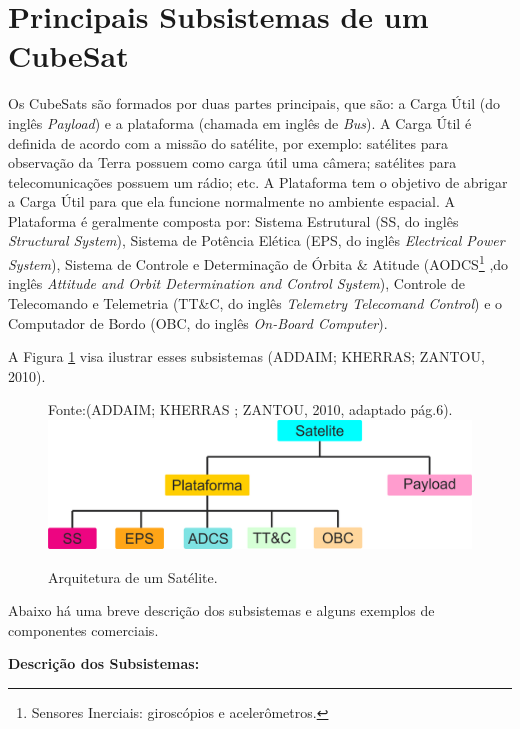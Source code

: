 \section{Principais Subsistemas de um CubeSat}

Os CubeSats são formados por duas partes principais, que são: a Carga Útil (do inglês \textit{Payload}) e a plataforma (chamada em inglês de \textit{Bus}). A Carga Útil é definida de acordo com a missão do satélite, por exemplo: satélites para observação da Terra possuem como carga útil uma câmera; satélites para telecomunicações possuem um rádio; etc. A Plataforma tem o objetivo de abrigar a Carga Útil para que ela funcione normalmente no ambiente espacial. A Plataforma é geralmente composta por: Sistema Estrutural (SS, do inglês \textit{Structural System}), Sistema de Potência Elética (EPS, do inglês \textit{Electrical Power System}), Sistema de Controle e Determinação de Órbita \& Atitude (AODCS\footnote{Sensores Inerciais: giroscópios e acelerômetros.} ,do inglês \textit{Attitude and Orbit Determination and Control System}), Controle de Telecomando e Telemetria (TT\&C, do inglês \textit{Telemetry Telecomand Control}) e o Computador de Bordo (OBC, do inglês \textit{On-Board Computer}). 

\newpage

A Figura \ref{fig06} visa ilustrar esses subsistemas (ADDAIM; KHERRAS; ZANTOU, 2010).

\begin{figure}[h]
	\centering
	Fonte:(ADDAIM; KHERRAS ; ZANTOU, 2010, adaptado pág.6).
	\includegraphics[keepaspectratio=true,scale=0.57]{figuras/estrutura_satellite.png}
	\caption{Arquitetura de um Satélite.}	
	\label{fig06}
\end{figure}
\FloatBarrier


Abaixo há uma breve descrição dos subsistemas e alguns exemplos de componentes comerciais.

\textbf{Descrição dos Subsistemas:}

